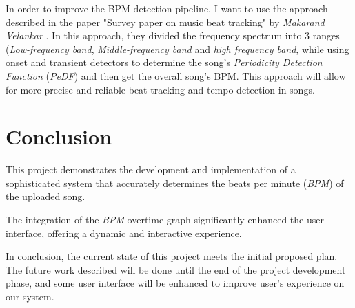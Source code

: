 \documentclass{IEEEtran}
\begin{document}
In order to improve the BPM detection pipeline, I want to use the approach described in the paper "Survey paper on music beat tracking" by \textit{Makarand Velankar} \cite{approachByMakarandVelankar}. In this approach, they divided the frequency spectrum into 3 ranges (\textit{Low-frequency band}, \textit{Middle-frequency band} and \textit{high frequency band}, while using onset and transient detectors to determine the song's \textit{Periodicity Detection Function} (\textit{PeDF}) and then get the overall song's BPM. This approach will allow for more precise and reliable beat tracking and tempo detection in songs.

\section{Conclusion}

This project demonstrates the development and implementation of a sophisticated system that accurately determines the beats per minute (\textit{BPM}) of the uploaded song.

The integration of the \textit{BPM} overtime graph significantly enhanced the user interface, offering a dynamic and interactive experience.

In conclusion, the current state of this project meets the initial proposed plan. The future work described will be done until the end of the project development phase, and some user interface will be enhanced to improve user's experience on our system.



\end{document}
